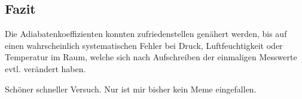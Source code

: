 \subsection{Fazit}
Die Adiabatenkoeffizienten konnten zufriedenstellen genähert werden, bis auf einen wahrscheinlich systematischen Fehler bei Druck, Luftfeuchtigkeit oder Temperatur im Raum, welche sich nach Aufschreiben der einmaligen Messwerte evtl. verändert haben.

Schöner schneller Versuch. Nur ist mir bisher kein Meme eingefallen.
